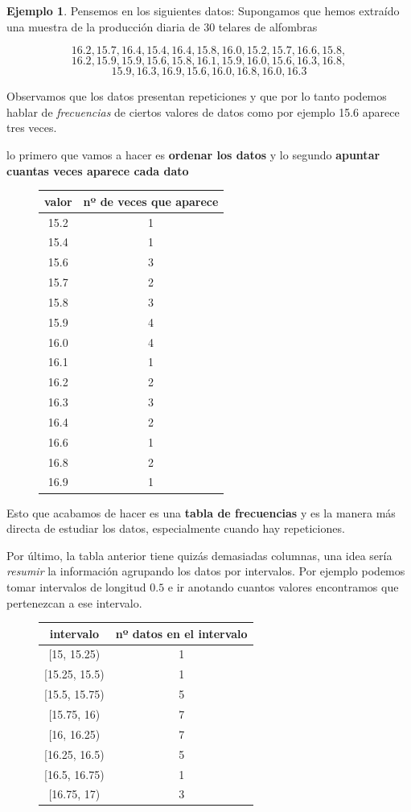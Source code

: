 \documentclass[]{article}
\theoremstyle{plain}
\theoremstyle{definition}
\newtheorem{example}[theorem]{Ejemplo}
\theoremstyle{definition} %
\begin{document}
\begin{example}
  
Pensemos en los siguientes datos: Supongamos que hemos extraído una
muestra de la producción diaria de 30 telares de alfombras

\[16.2, 15.7, 16.4, 15.4, 16.4, 15.8, 16.0, 15.2, 15.7, 16.6, 15.8,\]
\[ 16.2, 15.9, 15.9, 15.6, 15.8, 16.1, 15.9, 16.0, 15.6, 16.3, 16.8,\]
\[ 15.9, 16.3, 16.9, 15.6, 16.0, 16.8, 16.0, 16.3\]

Observamos que los datos presentan repeticiones y que por lo tanto
podemos hablar de \emph{frecuencias} de ciertos valores de datos como
por ejemplo 15.6 aparece tres veces.

lo primero que vamos a hacer es \textbf{ordenar los datos} y lo segundo
\textbf{apuntar cuantas veces aparece cada dato}

\begin{figure}
  \centering
\begin{tabular}{cc}
valor & nº de veces que aparece\\
\hline
15.2 & 1\\
15.4 & 1\\
15.6 & 3\\
15.7 & 2\\
15.8 & 3\\
15.9 & 4\\
16.0 & 4\\
16.1 & 1\\
16.2 & 2\\
16.3 & 3\\
16.4 & 2\\
16.6 & 1\\
16.8 & 2\\
16.9 & 1
\end{tabular}
\end{figure}

Esto que acabamos de hacer es una \textbf{tabla de frecuencias} y es la
manera más directa de estudiar los datos, especialmente cuando hay
repeticiones.

Por último, la tabla anterior tiene quizás demasiadas columnas, una idea
sería \emph{resumir} la información agrupando los datos por intervalos.
Por ejemplo podemos tomar intervalos de longitud \(0.5\) e ir anotando
cuantos valores encontramos que pertenezcan a ese intervalo.

\begin{figure}
  \centering
\begin{tabular}{cc}
intervalo & nº datos en el intervalo\\
\hline
{[}15, 15.25) & 1  \\
{[}15.25, 15.5) & 1\\
{[}15.5, 15.75) & 5\\
{[}15.75, 16) & 7  \\
{[}16, 16.25) & 7  \\
{[}16.25, 16.5) & 5\\
{[}16.5, 16.75) & 1\\
{[}16.75, 17) & 3  \\
\end{tabular}
\end{figure}

\end{example}
\end{document}
